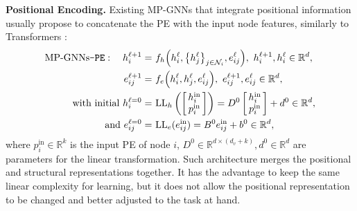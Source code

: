 \documentclass{article} \usepackage{iclr2021_conference,times}
\begin{document}
{\bf Positional Encoding.} Existing MP-GNNs that integrate positional information usually 
propose to concatenate the PE with the input node features, similarly to Transformers \citep{vaswani2017attention}:
\begin{align}
    \text{MP-GNNs\texttt{-PE}}: \ \ \  h_i^{\ell+1} =& \ f_{h} \Big( h_i^{\ell}, \big\{h_j^{\ell}\big\}_{j \in \mathcal{N}_i}, e_{ij}^{\ell} \Big), \ h_i^{\ell+1},h_i^{\ell}\in\mathbb{R}^{d}, \label{eqn:mpgnn-pe}\\
    e_{ij}^{\ell+1} =& \ f_{e} \Big( h_i^{\ell}, h_j^{\ell}, e_{ij}^{\ell}\Big), \ e_{ij}^{\ell+1},e_{ij}^{\ell}\in\mathbb{R}^{d}, \label{eqn:mpgnn_e_update_PE}\\
\textrm{with initial } h_i^{\ell=0} =& \textrm{ LL}_h \left(\left[\!\!\begin{array}{c} h_i^\textrm{in} \\ p_i^\textrm{in} \\ \end{array}\!\!\right]\right) = D^0 \left[\!\!\begin{array}{c} h_i^\textrm{in} \\ p_i^\textrm{in} \\ \end{array}\!\!\right] + d^0 \in\mathbb{R}^{d}, \label{eqn:mpgnn-pe-input}\\
    \textrm{and } e_{ij}^{\ell=0} =& \textrm{ LL}_e (e_{ij}^\textrm{in}) = B^0 e_{ij}^\textrm{in} + b^0 \in\mathbb{R}^{d},
\end{align}
where $p_i^\textrm{in}\in \mathbb{R}^k$ is the input PE of node $i$, $D^0 \in \mathbb{R}^{d \times (d_v+k)}, d^0 \in \mathbb{R}^d$ are parameters for the linear transformation. Such architecture merges the positional and structural representations together. It has the advantage to keep the same linear complexity for learning, but it does not allow the positional representation to be changed and better adjusted to the task at hand.
\end{document}
